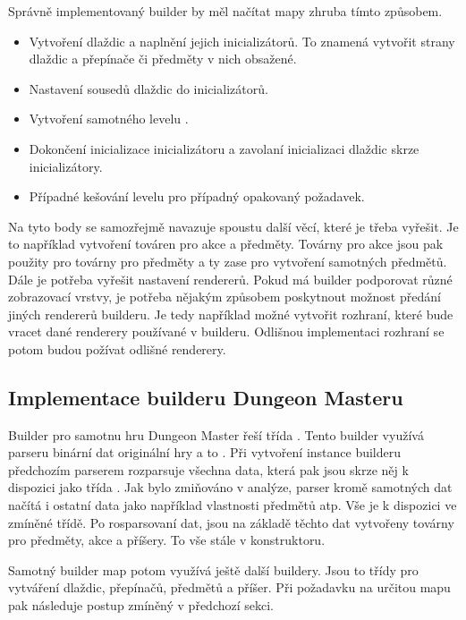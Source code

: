 Správně implementovaný builder by měl načítat mapy zhruba tímto způsobem. 

\begin{itemize}

\item Vytvoření dlaždic a naplnění jejich inicializátorů. 
To znamená vytvořit strany dlaždic a přepínače či předměty v nich obsažené.

\item Nastavení sousedů dlaždic do inicializátorů. 

\item Vytvoření samotného levelu .

\item Dokončení inicializace inicializátoru a zavolaní inicializaci dlaždic skrze inicializátory. 

\item Případné kešování levelu pro případný opakovaný požadavek. 
\end{itemize}

Na tyto body se samozřejmě navazuje spoustu další věcí, které je třeba vyřešit. 
Je to například vytvoření továren pro akce a předměty. Továrny pro akce jsou pak použity pro
továrny pro předměty a ty zase pro vytvoření samotných předmětů. Dále je potřeba vyřešit 
nastavení rendererů. Pokud má builder podporovat různé zobrazovací vrstvy, je potřeba 
nějakým způsobem poskytnout možnost předání jiných rendererů builderu. Je tedy například
možné vytvořit rozhraní, které bude vracet dané renderery používané v builderu. Odlišnou
implementaci rozhraní se potom budou požívat odlišné renderery.


\subsection{Implementace builderu Dungeon Masteru}
Builder pro samotnu hru Dungeon Master řeší třída . Tento builder
využívá parseru binární dat originální hry a to . Při vytvoření instance 
builderu předchozím parserem rozparsuje všechna data, která pak jsou skrze něj k dispozici jako 
třída . Jak bylo zmiňováno v analýze, parser kromě samotných dat načítá 
i ostatní data jako například vlastnosti předmětů atp. Vše je k dispozici ve zmíněné třídě.
Po rosparsovaní dat, jsou na základě těchto dat vytvořeny továrny pro předměty, akce a příšery.
To vše stále v konstruktoru. 

Samotný builder map potom využívá ještě další buildery. Jsou to třídy pro vytváření
dlaždic, přepínačů, předmětů a příšer. Při požadavku na určitou mapu pak 
následuje postup zmíněný v předchozí sekci.


